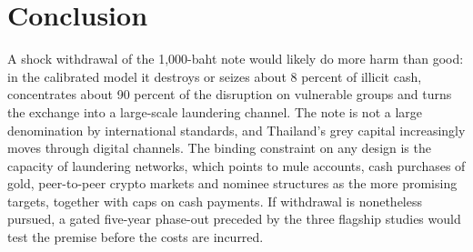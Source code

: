 \documentclass[11pt]{article}
\theoremstyle{definition}
\theoremstyle{remark}
\begin{document}
\section{Conclusion}\label{sec:conclusion}
A shock withdrawal of the 1,000-baht note would likely do more harm than good: in the calibrated model it destroys or
seizes about 8 percent of illicit cash, concentrates about 90 percent of the disruption on vulnerable groups and turns the
exchange into a large-scale laundering channel. The note is not a large denomination by international standards, and
Thailand's grey capital increasingly moves through digital channels. The binding constraint on any design is the capacity
of laundering networks, which points to mule accounts, cash purchases of gold, peer-to-peer crypto markets and nominee
structures as the more promising targets, together with caps on cash payments. If withdrawal is nonetheless pursued, a
gated five-year phase-out preceded by the three flagship studies would test the premise before the costs are incurred.
\end{document}
